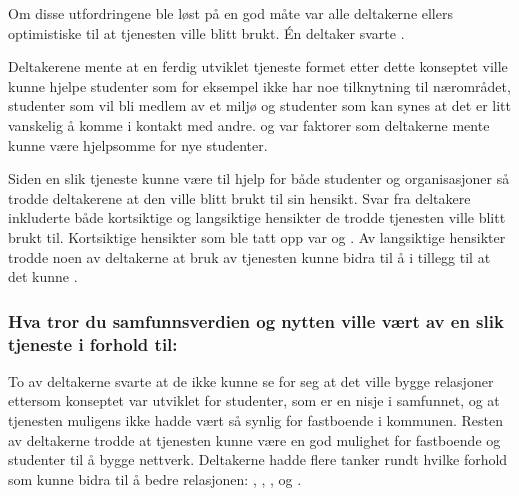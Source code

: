 Om disse utfordringene ble løst på en god måte var alle deltakerne ellers optimistiske til at tjenesten ville blitt brukt. Én deltaker svarte . 

Deltakerene mente at en ferdig utviklet tjeneste formet etter dette konseptet ville kunne hjelpe studenter som for eksempel ikke har noe tilknytning til nærområdet, studenter som vil bli medlem av et miljø og studenter som kan synes at det er litt vanskelig å komme i kontakt med andre.  og  var faktorer som deltakerne mente kunne være hjelpsomme for nye studenter.

Siden en slik tjeneste kunne være til hjelp for både studenter og organisasjoner så trodde deltakerene at den ville blitt brukt til sin hensikt. Svar fra deltakere inkluderte både kortsiktige og langsiktige hensikter de trodde tjenesten ville blitt brukt til. Kortsiktige hensikter som ble tatt opp var  og . Av langsiktige hensikter trodde noen av deltakerne at bruk av tjenesten kunne bidra til å  i tillegg til at det kunne .

\setlength{\leftskip}{0pt}
\subsubsection{Hva tror du samfunnsverdien og nytten ville vært av en slik tjeneste i forhold til:}

\setlength{\leftskip}{2em}
To av deltakerne svarte at de ikke kunne se for seg at det ville bygge relasjoner ettersom konseptet var utviklet for studenter, som er en nisje i samfunnet, og at tjenesten muligens ikke hadde vært så synlig for fastboende i kommunen. Resten av deltakerne trodde at tjenesten kunne være en god mulighet for fastboende og studenter til å bygge nettverk. Deltakerne hadde flere tanker rundt hvilke forhold som kunne bidra til å bedre relasjonen: , , ,  og .


